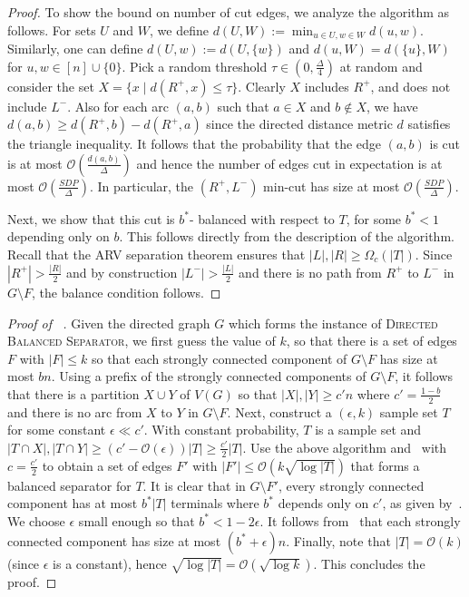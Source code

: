 \documentclass[11pt]{article}
\newcommand{\OO}{\mathcal{O}}
\newcommand{\DB}{{\textsc{Directed Balanced Separator}}}
\begin{document}
{\begin{proof}
To show the bound on number of cut edges, we analyze the algorithm as follows. For sets $U$ and $W$, we define $d(U,W) := \min_{u \in U, w \in W} d(u,w)$. Similarly, one can define $d(U,w) := d(U,\{w\})$ and $d(u,W) = d(\{u\},W)$ for $u,w \in [n] \cup \{0\}$. Pick a random threshold $\tau \in (0, \frac{\Delta}{4})$ at random and consider the set $X = \{x \mid d(R^+, x) \leq \tau\}$. Clearly $X$ includes $R^+$, and does not include $L^{-}$. Also for each arc $(a,b)$ such that $a \in X$ and $b \notin X$, we have $d(a,b) \geq d(R^+, b) - d(R^+, a)$ since the directed distance metric $d$ satisfies the triangle inequality. It follows that the probability that the edge $(a,b)$ is cut is at most $\OO(\frac{d(a,b)}{\Delta})$ and hence the number of edges cut in expectation is at most $\OO(\frac{SDP}{\Delta})$. In particular, the $(R^+, L^-)$ min-cut has size at most $\OO(\frac{SDP}{\Delta})$.   

Next, we show that this cut is $b^*$- balanced with respect to $T$, for some $b^* < 1$ depending only on $b$. This follows directly from the description of the algorithm. Recall that the ARV separation theorem ensures that $|L|, |R| \geq \Omega_c(|T|)$. Since $|R^+| > \frac{|R|}{2}$ and by construction $|L^-| > \frac{|L|}{2}$ and there is no path from $R^+$ to $L^-$ in $G \setminus F$, the balance condition follows.
\end{proof}



\begin{proof}[Proof of ~]
Given the directed graph $G$ which forms the instance of \DB{}, we first guess the value of $k$, so that there is a set of edges $F$ with $|F| \leq k$ so that each strongly connected component of $G \setminus F$ has size at most $bn$. Using a prefix of the strongly connected components of $G \setminus F$, it follows that there is a partition $X \cup Y$ of $V(G)$ so that $|X|, |Y| \geq c'n$ where $c' = \frac{1-b}{2}$ and there is no arc from $X$ to $Y$ in $G \setminus F$. Next, construct a $(\epsilon, k)$ sample set $T$ for some constant $\epsilon \ll c'$. With constant probability, $T$ is a sample set and $|T \cap X|, |T \cap Y| \geq (c' - \OO(\epsilon))|T| \geq \frac{c'}{2}|T|$.  Use the above algorithm and~ with $c = \frac{c'}{2}$ to obtain a set of edges $F'$ with $|F'| \leq \OO(k \sqrt{\log |T|})$ that forms a balanced separator for $T$. It is clear that in $G \setminus F'$, every strongly connected component has at most $b^*|T|$ terminals where $b^*$ depends only on $c'$, as given by~. We choose $\epsilon$ small enough so that $b^* < 1- 2\epsilon$. It follows from~ that each strongly connected component has size at most $(b^* + \epsilon)n$. Finally, note that $|T| = \OO(k)$ (since $\epsilon$ is a constant), hence $\sqrt{\log |T|} = \OO(\sqrt{\log k})$. This concludes the proof.




\end{proof}}
\end{document}
